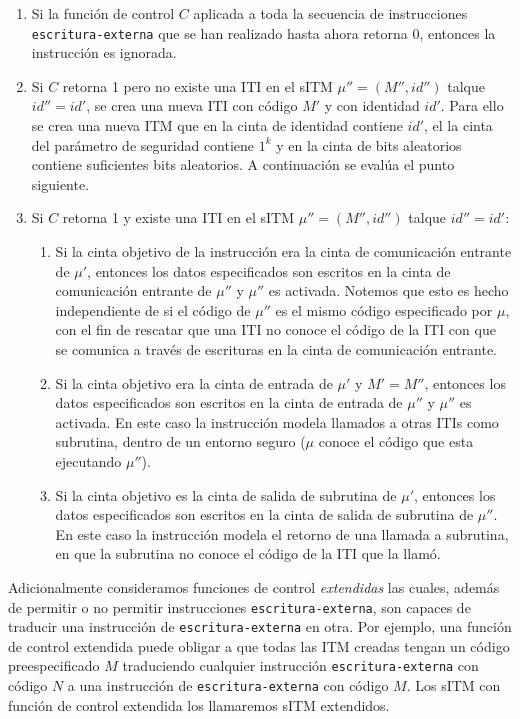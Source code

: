 \begin{enumerate}
    \item Si la función de control $C$ aplicada a toda la secuencia de instrucciones \texttt{escritura-externa}
          que se han realizado hasta ahora retorna 0, entonces la instrucción es ignorada.
    \item Si $C$ retorna 1 pero no existe una ITI en el sITM $\mu'' = (M'', id'')$ talque $id''=id'$, se
          crea una nueva ITI con código $M'$ y con identidad $id'$. Para ello se crea una nueva ITM
          que en la cinta de identidad contiene $id'$, el la cinta del parámetro de seguridad contiene $1^k$
          y en la cinta de bits aleatorios contiene suficientes bits aleatorios. A continuación se evalúa
          el punto siguiente.
    \item Si $C$ retorna 1 y existe una ITI en el sITM $\mu'' = (M'', id'')$ talque $id''=id'$:
    \begin{enumerate}
        \item Si la cinta objetivo de la instrucción era la cinta de comunicación entrante de $\mu'$, entonces
              los datos especificados son escritos en la cinta de comunicación entrante de $\mu''$ y $\mu''$
              es activada. Notemos que esto es hecho independiente de si el código de $\mu''$ es el mismo
              código especificado por $\mu$, con el fin de rescatar que una ITI no conoce el código de la
              ITI con que se comunica a través de escrituras en la cinta de comunicación entrante.
        \item Si la cinta objetivo era la cinta de entrada de $\mu'$ y $M' = M''$, entonces los datos
              especificados son escritos en la cinta de entrada de $\mu''$ y $\mu''$ es activada. En este caso
              la instrucción modela llamados a otras ITIs como subrutina, dentro de un entorno seguro ($\mu$
              conoce el código que esta ejecutando $\mu''$).
        \item Si la cinta objetivo es la cinta de salida de subrutina de $\mu'$, entonces los datos
              especificados son escritos en la cinta de salida de subrutina de $\mu''$. En este caso la
              instrucción modela el retorno de una llamada a subrutina, en que la subrutina no conoce
              el código de la ITI que la llamó.
    \end{enumerate}
\end{enumerate}

Adicionalmente consideramos funciones de control \textit{extendidas} las cuales, además de permitir
o no permitir instrucciones \texttt{escritura-externa}, son capaces de traducir una instrucción de
\texttt{escritura-externa} en otra. Por ejemplo, una función de control extendida puede obligar
a que todas las ITM creadas tengan un código preespecificado $M$ traduciendo cualquier instrucción
\texttt{escritura-externa} con código $N$ a una instrucción de \texttt{escritura-externa} con código
$M$. Los sITM con función de control extendida los llamaremos sITM extendidos.\\

